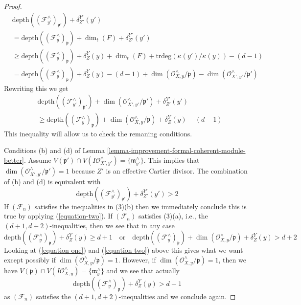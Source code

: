 \begin{proof}
\begin{equation}
\label{equation-one}
\begin{aligned}
&
\text{depth}((\mathcal{F}_{y'}^\wedge)_{\mathfrak p'}) +
\delta^{Y'}_{Z'}(y') \\
& =
\text{depth}((\mathcal{F}_y^\wedge)_{\mathfrak p}) +
\dim_t(F) + \delta^{Y'}_{Z'}(y') \\
& \geq
\text{depth}((\mathcal{F}_y^\wedge)_{\mathfrak p}) + \delta^Y_Z(y) +
\dim_t(F) + \text{trdeg}(\kappa(y')/\kappa(y)) - (d - 1) \\
& =
\text{depth}((\mathcal{F}_y^\wedge)_{\mathfrak p}) + \delta^Y_Z(y) - (d - 1)
+ \dim(\mathcal{O}_{X, y}^\wedge/\mathfrak p) -
\dim(\mathcal{O}_{X', y'}^\wedge/\mathfrak p')
\end{aligned}
\end{equation}
Rewriting this we get
\begin{equation}
\label{equation-two}
\begin{aligned}
&
\text{depth}((\mathcal{F}_{y'}^\wedge)_{\mathfrak p'}) +
\dim(\mathcal{O}_{X', y'}^\wedge/\mathfrak p') +
\delta^{Y'}_{Z'}(y') \\
& \geq
\text{depth}((\mathcal{F}_y^\wedge)_{\mathfrak p}) +
\dim(\mathcal{O}_{X, y}^\wedge/\mathfrak p) +
\delta^Y_Z(y) - (d - 1)
\end{aligned}
\end{equation}
This inequality will allow us to check the remaning conditions.

\medskip\noindent
Conditions (b) and (d) of
Lemma \ref{lemma-improvement-formal-coherent-module-better}. Assume
$V(\mathfrak p') \cap V(I\mathcal{O}_{X', y'}^\wedge) =
\{\mathfrak m_{y'}^\wedge\}$.
This implies that $\dim(\mathcal{O}_{X', y'}^\wedge/\mathfrak p') = 1$
because $Z'$ is an effective Cartier divisor.
The combination of (b) and (d) is equivalent with
$$
\text{depth}((\mathcal{F}_{y'}^\wedge)_{\mathfrak p'}) + \delta^{Y'}_{Z'}(y')
> 2
$$
If $(\mathcal{F}_n)$ satisfies the inequalities in (3)(b)
then we immediately conclude this is true by applying (\ref{equation-two}).
If $(\mathcal{F}_n)$ satisfies (3)(a), i.e., the
$(d + 1, d + 2)$-inequalities, then we see that in any case
$$
\text{depth}((\mathcal{F}_y^\wedge)_{\mathfrak p}) + \delta^Y_Z(y)
\geq d + 1
\quad\text{or}\quad
\text{depth}((\mathcal{F}_y^\wedge)_{\mathfrak p}) +
\dim(\mathcal{O}_{X, y}^\wedge/\mathfrak p) +
\delta^Y_Z(y) > d + 2
$$
Looking at (\ref{equation-one}) and (\ref{equation-two}) above this gives
what we want except possibly if
$\dim(\mathcal{O}_{X, y}^\wedge/\mathfrak p) = 1$.
However, if $\dim(\mathcal{O}_{X, y}^\wedge/\mathfrak p) = 1$, then we have
$V(\mathfrak p) \cap V(I\mathcal{O}_{X, y}^\wedge) = \{\mathfrak m_y^\wedge\}$
and we see that actually
$$
\text{depth}((\mathcal{F}_y^\wedge)_{\mathfrak p}) + \delta^Y_Z(y) > d + 1
$$
as $(\mathcal{F}_n)$ satisfies the $(d + 1, d + 2)$-inequalities and we
conclude again.


\end{proof}
